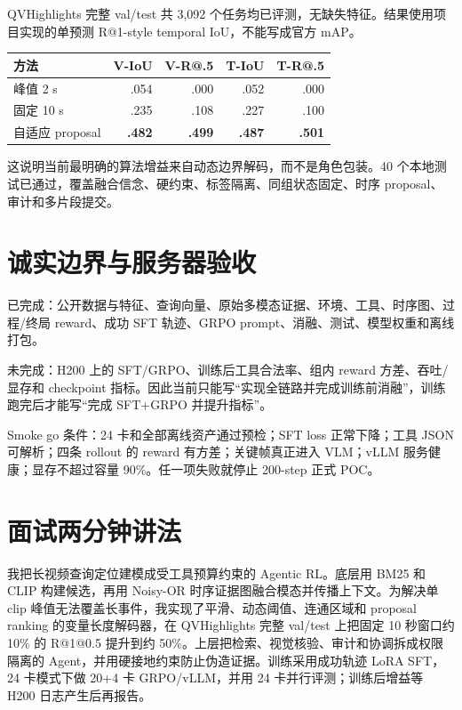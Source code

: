 \documentclass[UTF8,letterpaper,10pt,twocolumn]{ctexart}
\begin{document}
QVHighlights 完整 val/test 共 3,092 个任务均已评测，无缺失特征。结果使用项目实现的单预测 R@1-style temporal IoU，不能写成官方 mAP。

\begin{center}
\scriptsize
\setlength{\tabcolsep}{3pt}
\begin{tabular}{lrrrr}
\toprule
方法 & V-IoU & V-R@.5 & T-IoU & T-R@.5\\
\midrule
峰值 2 s & .054 & .000 & .052 & .000\\
固定 10 s & .235 & .108 & .227 & .100\\
自适应 proposal & \textbf{.482} & \textbf{.499} & \textbf{.487} & \textbf{.501}\\
\bottomrule
\end{tabular}
\end{center}

这说明当前最明确的算法增益来自动态边界解码，而不是角色包装。40 个本地测试已通过，覆盖融合信念、硬约束、标签隔离、同组状态固定、时序 proposal、审计和多片段提交。

\section{诚实边界与服务器验收}

已完成：公开数据与特征、查询向量、原始多模态证据、环境、工具、时序图、过程/终局 reward、成功 SFT 轨迹、GRPO prompt、消融、测试、模型权重和离线打包。

未完成：H200 上的 SFT/GRPO、训练后工具合法率、组内 reward 方差、吞吐/显存和 checkpoint 指标。因此当前只能写“实现全链路并完成训练前消融”，训练跑完后才能写“完成 SFT+GRPO 并提升指标”。

Smoke go 条件：24 卡和全部离线资产通过预检；SFT loss 正常下降；工具 JSON 可解析；四条 rollout 的 reward 有方差；关键帧真正进入 VLM；vLLM 服务健康；显存不超过容量 90\%。任一项失败就停止 200-step 正式 POC。

\section{面试两分钟讲法}

我把长视频查询定位建模成受工具预算约束的 Agentic RL。底层用 BM25 和 CLIP 构建候选，再用 Noisy-OR 时序证据图融合模态并传播上下文。为解决单 clip 峰值无法覆盖长事件，我实现了平滑、动态阈值、连通区域和 proposal ranking 的变量长度解码器，在 QVHighlights 完整 val/test 上把固定 10 秒窗口约 10\% 的 R@1@0.5 提升到约 50\%。上层把检索、视觉核验、审计和协调拆成权限隔离的 Agent，并用硬接地约束防止伪造证据。训练采用成功轨迹 LoRA SFT，24 卡模式下做 20+4 卡 GRPO/vLLM，并用 24 卡并行评测；训练后增益等 H200 日志产生后再报告。
\end{document}
